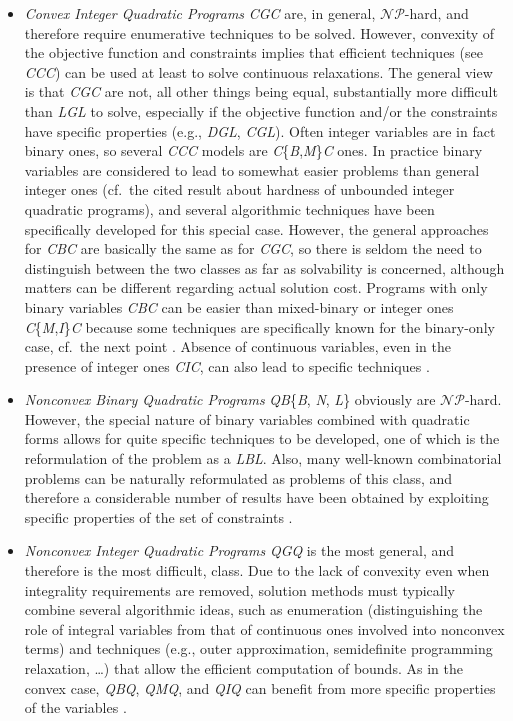 \begin{itemize}
 \item \emph{Convex Integer Quadratic Programs} \textit{CGC} are, in general, $\mathcal{NP}$-hard, and therefore require enumerative techniques to be solved. However, convexity of the objective function and constraints implies that efficient techniques (see \textit{CCC}) can be used at least to solve continuous relaxations. The general view is that \textit{CGC} are not, all other things being equal,  substantially more difficult than \textit{LGL} to solve, especially if the objective function and/or the constraints have specific properties (e.g., \textit{DGL}, \textit{CGL}). Often integer variables are in fact binary ones, so several \textit{CCC} models are \textit{C}\{\textit{B},\textit{M}\}\textit{C} ones. In practice binary variables are considered to lead to somewhat easier problems than general integer ones (cf.~the cited result about hardness of unbounded integer quadratic programs), and several algorithmic techniques have been specifically developed for this special case. However, the general approaches for \textit{CBC} are basically the same as for \textit{CGC}, so there is seldom the need to distinguish between the two classes as far as solvability is concerned, although matters can be different regarding actual solution cost. Programs with only binary variables \textit{CBC} can be easier than mixed-binary or integer ones \textit{C}\{\textit{M},\textit{I}\}\textit{C} because some techniques are specifically known for the binary-only case, cf.~the next point \cite{BEP09}. Absence of continuous variables, even in the presence of integer ones \textit{CIC}, can also lead to specific techniques \cite{BEL13}.
  \item \emph{Nonconvex Binary Quadratic Programs} \textit{QB}\{\textit{B}, \textit{N}, \textit{L}\} obviously are $\mathcal{NP}$-hard. However, the special nature of binary variables combined with quadratic forms allows for quite specific techniques to be developed, one of which is the reformulation of the problem as a \textit{LBL}. Also, many well-known combinatorial problems can be naturally reformulated as problems of this class, and therefore a considerable number of results have been obtained by exploiting specific properties of the set of constraints \cite{Rendl2008,Loiola2007657}.
  \item \emph{Nonconvex Integer Quadratic Programs} \textit{QGQ} is the most general, and therefore is the most difficult, class. Due to the lack of convexity even when integrality requirements are removed, solution methods must typically combine several algorithmic ideas, such as enumeration (distinguishing the role of integral variables from that of continuous ones involved into nonconvex terms) and techniques (e.g., outer approximation, semidefinite programming relaxation, \ldots) that allow the efficient computation of bounds. As in the convex case, \textit{QBQ}, \textit{QMQ}, and \textit{QIQ} can benefit from more specific properties of the variables \cite{Buchheim2013,Dong2016}.
\end{itemize}
